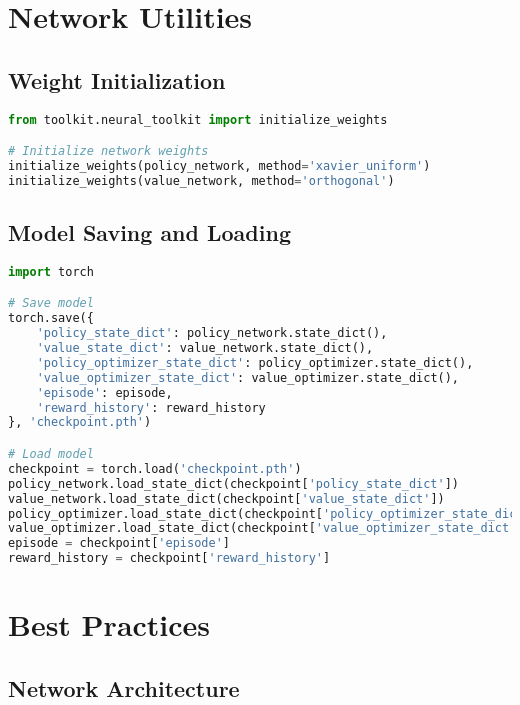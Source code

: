 \section{Network Utilities}

\subsection{Weight Initialization}

\begin{lstlisting}[language=python, caption=Weight Initialization]
from toolkit.neural_toolkit import initialize_weights

# Initialize network weights
initialize_weights(policy_network, method='xavier_uniform')
initialize_weights(value_network, method='orthogonal')
\end{lstlisting}

\subsection{Model Saving and Loading}

\begin{lstlisting}[language=python, caption=Model Persistence]
import torch

# Save model
torch.save({
    'policy_state_dict': policy_network.state_dict(),
    'value_state_dict': value_network.state_dict(),
    'policy_optimizer_state_dict': policy_optimizer.state_dict(),
    'value_optimizer_state_dict': value_optimizer.state_dict(),
    'episode': episode,
    'reward_history': reward_history
}, 'checkpoint.pth')

# Load model
checkpoint = torch.load('checkpoint.pth')
policy_network.load_state_dict(checkpoint['policy_state_dict'])
value_network.load_state_dict(checkpoint['value_state_dict'])
policy_optimizer.load_state_dict(checkpoint['policy_optimizer_state_dict'])
value_optimizer.load_state_dict(checkpoint['value_optimizer_state_dict'])
episode = checkpoint['episode']
reward_history = checkpoint['reward_history']
\end{lstlisting}

\section{Best Practices}

\subsection{Network Architecture}

